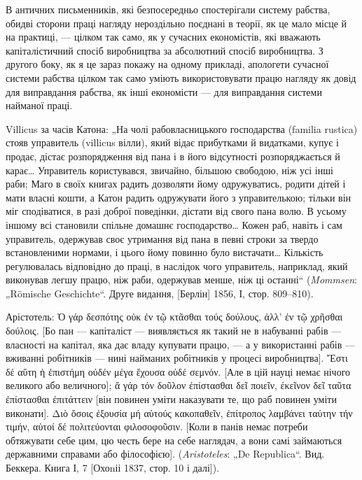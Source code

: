 В античних письменників, які безпосередньо спостерігали
систему рабства, обидві сторони праці нагляду нероздільно поєднані
в теорії, як це мало місце й на практиці, — цілком так
само, як у сучасних економістів, які вважають капіталістичний
спосіб виробництва за абсолютний спосіб виробництва. З другого
боку, як я це зараз покажу на одному прикладі, апологети
сучасної системи рабства цілком так само уміють використовувати
працю нагляду як довід для виправдання рабства, як інші
економісти — для виправдання системи найманої праці.

Villicus за часів Катона: „На чолі рабовласницького господарства
(familia rustica) стояв управитель (villicus вілли), який відає
прибутками й видатками, купує і продає, дістає розпорядження
від пана і в його відсутності розпоряджається й карає\dots{}
Управитель користувався, звичайно, більшою свободою, ніж
усі інші раби; Маго в своїх книгах радить дозволяти йому одружуватись,
родити дітей і мати власні кошти, а Катон радить
одружувати його з управителькою; тільки він міг сподіватися,
в разі доброї поведінки, дістати від свого пана волю. В усьому
іншому всі становили спільне домашнє господарство\dots{} Кожен
раб, навіть і сам управитель, одержував своє утримання від
пана в певні строки за твердо встановленими нормами, і цього
йому повинно було вистачати\dots{} Кількість регулювалась відповідно
до праці, в наслідок чого управитель, наприклад, який
виконував легшу працю, ніж раби, одержував менше, ніж ці
останні“ (\emph{Mommsen}: „Römische Geschichte“. Друге видання, [Берлін]
1856, І, стор. 809--810).

Арістотель: \textgreek{Ὀ γάρ δεσπότης οὐκ ἐν τῷ  κτᾶσθαι τούς δούλους, ἀλλ’ ἐν τῷ
χρῆσθαι δούλοις}. [Бо пан — капіталіст — виявляється як такий не в
набуванні рабів — власності на капітал, яка дає владу купувати
працю, — а у використанні рабів — вживанні робітників — нині
найманих робітників у процесі виробництва]. \textgreek{Ἔστι δέ αὕτη ἡ ἐπιστήμη
οὐδέν μέγα ἕχουσα οὐδέ σεμνόν}. [Але в цій науці немає нічого великого
або величного]; \textgreek{ἄ γάρ τόν δοῦλον ἐπίστασθαι δεῖ ποιεῖν, έκεῖνον δεῖ
ταῦτα ἐπίστασθαι ἐπιτάττειν} [він повинен уміти наказувати те, що раб
повинен уміти виконати]. \textgreek{Διὸ ὅσοις ἐξουσία μή αὑτούς κακοπαθεῖν, ἐπίτροπος
λαμβάνει ταύτην τήν τιμήν, αὐτοί δέ πολιτεύονται φιλοσοφοῦσιν}.
[Коли в панів немає потреби обтяжувати себе цим, цю честь
бере на себе наглядач, а вони самі займаються державними
справами або філософією]. (\emph{Aristoteles}: „De Republica“. Вид.
Беккера. Книга І, 7 [Охоnіі 1837, стор. 10 і далі]).

